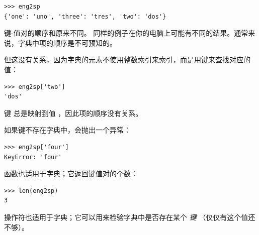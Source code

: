 \begin{lstlisting}
>>> eng2sp
{'one': 'uno', 'three': 'tres', 'two': 'dos'}
\end{lstlisting}

%

键-值对的顺序和原来不同。
同样的例子在你的电脑上可能有不同的结果。通常来说，字典中项的顺序是不可预知的。


但这没有关系，因为字典的元素不使用整数索引来索引，而是用键来查找对应的值：

\begin{lstlisting}
>>> eng2sp['two']
'dos'
\end{lstlisting}

%

键  总是映射到值  ，因此项的顺序没有关系。


如果键不存在字典中，会抛出一个异常：

  

\begin{lstlisting}
>>> eng2sp['four']
KeyError: 'four'
\end{lstlisting}

%

 函数也适用于字典；它返回键值对的个数：

  

\begin{lstlisting}
>>> len(eng2sp)
3
\end{lstlisting}

%

 操作符也适用于字典；它可以用来检验字典中是否存在某个 {\em 键} （仅仅有这个值还不够）。

